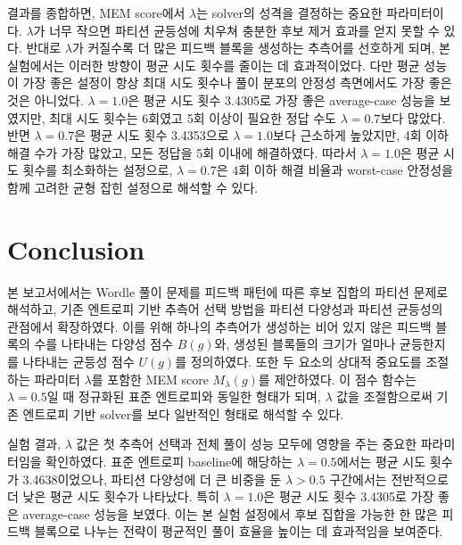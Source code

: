 \documentclass[11pt]{article}
\begin{document}
결과를 종합하면, MEM score에서 $\lambda$는 solver의 성격을 결정하는 중요한 파라미터이다.
$\lambda$가 너무 작으면 파티션 균등성에 치우쳐 충분한 후보 제거 효과를 얻지 못할 수 있다.
반대로 $\lambda$가 커질수록 더 많은 피드백 블록을 생성하는 추측어를 선호하게 되며,
본 실험에서는 이러한 방향이 평균 시도 횟수를 줄이는 데 효과적이었다.
다만 평균 성능이 가장 좋은 설정이 항상 최대 시도 횟수나 풀이 분포의 안정성 측면에서도 가장 좋은 것은 아니었다.
$\lambda = 1.0$은 평균 시도 횟수 3.4305로 가장 좋은 average-case 성능을 보였지만,
최대 시도 횟수는 6회였고 5회 이상이 필요한 정답 수도 $\lambda = 0.7$보다 많았다.
반면 $\lambda = 0.7$은 평균 시도 횟수 3.4353으로 $\lambda = 1.0$보다 근소하게 높았지만,
4회 이하 해결 수가 가장 많았고, 모든 정답을 5회 이내에 해결하였다.
따라서 $\lambda = 1.0$은 평균 시도 횟수를 최소화하는 설정으로,
$\lambda = 0.7$은 4회 이하 해결 비율과 worst-case 안정성을 함께 고려한 균형 잡힌 설정으로 해석할 수 있다.

































\section{Conclusion}
\label{sec:conclusion}
본 보고서에서는 Wordle 풀이 문제를 피드백 패턴에 따른 후보 집합의 파티션 문제로 해석하고,
기존 엔트로피 기반 추측어 선택 방법을 파티션 다양성과 파티션 균등성의 관점에서 확장하였다.
이를 위해 하나의 추측어가 생성하는 비어 있지 않은 피드백 블록의 수를 나타내는 다양성 점수 $B(g)$와,
생성된 블록들의 크기가 얼마나 균등한지를 나타내는 균등성 점수 $U(g)$를 정의하였다.
또한 두 요소의 상대적 중요도를 조절하는 파라미터 $\lambda$를 포함한 MEM score
$M_{\lambda}(g)$를 제안하였다.
이 점수 함수는 $\lambda = 0.5$일 때 정규화된 표준 엔트로피와 동일한 형태가 되며,
$\lambda$ 값을 조절함으로써 기존 엔트로피 기반 solver를 보다 일반적인 형태로 해석할 수 있다.

실험 결과, $\lambda$ 값은 첫 추측어 선택과 전체 풀이 성능 모두에 영향을 주는 중요한 파라미터임을 확인하였다.
표준 엔트로피 baseline에 해당하는 $\lambda = 0.5$에서는 평균 시도 횟수가 3.4638이었으나,
파티션 다양성에 더 큰 비중을 둔 $\lambda > 0.5$ 구간에서는 전반적으로 더 낮은 평균 시도 횟수가 나타났다.
특히 $\lambda = 1.0$은 평균 시도 횟수 3.4305로 가장 좋은 average-case 성능을 보였다.
이는 본 실험 설정에서 후보 집합을 가능한 한 많은 피드백 블록으로 나누는 전략이 평균적인 풀이 효율을 높이는 데 효과적임을 보여준다.
\end{document}
